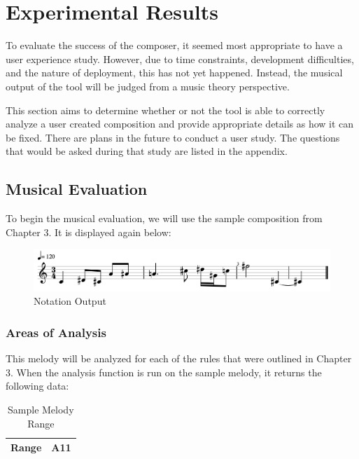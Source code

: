 \chapter{Experimental Results} 
\label{ch:experimentalresults}

To evaluate the success of the composer, it seemed most appropriate to have a user experience study.  However, due to time constraints, development difficulties, and the nature of deployment, this has not yet happened.  Instead, the musical output of the tool will be judged from a music theory perspective.

\vspace{\baselineskip}

This section aims to determine whether or not the tool is able to correctly analyze a user created composition and provide appropriate details as how it can be fixed.  There are plans in the future to conduct a user study.  The questions that would be asked during that study are listed in the appendix.

\section{Musical Evaluation}
\label{sec:musicalevaluation}

To begin the musical evaluation, we will use the sample composition from Chapter 3.  It is displayed again below:

\begin{figure}[!htbp]
	\centering
	\caption{Notation Output}
	\includegraphics[scale=0.4]{images/notation.png}
\end{figure}

\pagebreak

\subsection{Areas of Analysis}
\label{subsec:areasofanalysis}

This melody will be analyzed for each of the rules that were outlined in Chapter 3.  When the analysis function is run on the sample melody, it returns the following data:

\begin{table}[!htbp]
	\centering
	\caption{Sample Melody Range}
	\begin{tabular}{|l|l|}
		\hline
		Range & A11 \\ \hline
	\end{tabular}
\end{table}

